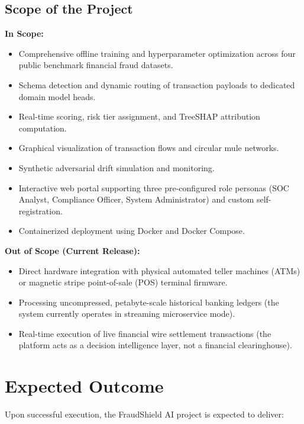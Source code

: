 \documentclass[12pt,a4paper,oneside]{report}
\begin{document}
\subsection{Scope of the Project}

\textbf{In Scope:}

\begin{itemize}[leftmargin=0.35in]
\item Comprehensive offline training and hyperparameter optimization across four public benchmark financial fraud datasets.
\item Schema detection and dynamic routing of transaction payloads to dedicated domain model heads.
\item Real-time scoring, risk tier assignment, and TreeSHAP attribution computation.
\item Graphical visualization of transaction flows and circular mule networks.
\item Synthetic adversarial drift simulation and monitoring.
\item Interactive web portal supporting three pre-configured role personas (SOC Analyst, Compliance Officer, System Administrator) and custom self-registration.
\item Containerized deployment using Docker and Docker Compose.
\end{itemize}

\textbf{Out of Scope (Current Release):}

\begin{itemize}[leftmargin=0.35in]
\item Direct hardware integration with physical automated teller machines (ATMs) or magnetic stripe point-of-sale (POS) terminal firmware.
\item Processing uncompressed, petabyte-scale historical banking ledgers (the system currently operates in streaming microservice mode).
\item Real-time execution of live financial wire settlement transactions (the platform acts as a decision intelligence layer, not a financial clearinghouse).
\end{itemize}


\section{Expected Outcome}

Upon successful execution, the FraudShield AI project is expected to deliver:
\end{document}
